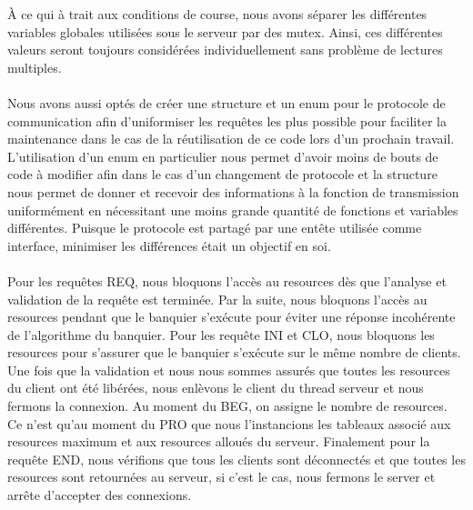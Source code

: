 \documentclass[11pt]{article}
\begin{document}
À ce qui à trait aux conditions de course, nous avons séparer les différentes variables globales utilisées sous le serveur par des mutex. Ainsi, ces différentes valeurs seront toujours considérées individuellement sans problème de lectures multiples. \\\\

Nous avons aussi optés de créer une structure et un enum pour le protocole de communication afin d'uniformiser les requêtes les plus possible pour faciliter la maintenance dans le cas de la réutilisation de ce code lors d'un prochain travail. L'utilisation d'un enum en particulier nous permet d'avoir moins de bouts de code à modifier afin dans le cas d'un changement de protocole et la structure nous permet de donner et recevoir des informations à la fonction de transmission uniformément en nécessitant une moins grande quantité de fonctions et variables différentes. Puisque le protocole est partagé par une entête utilisée comme interface, minimiser les différences était un objectif en soi.\\\\

Pour les requêtes REQ, nous bloquons l'accès au resources dès que l'analyse et validation de la requête est terminée. Par la suite, nous bloquons l'accès au resources pendant que le banquier s'exécute pour éviter une réponse incohérente de l'algorithme du banquier. Pour les requête INI et CLO, nous bloquons les resources pour s'assurer que le banquier s'exécute sur le même nombre de clients. Une fois que la validation et nous nous sommes  assurés que toutes les resources du client ont été libérées, nous enlèvons le client du thread serveur et nous fermons la connexion. Au moment du BEG, on assigne le nombre de resources. Ce n'est qu'au moment du PRO que nous l'instancions les tableaux associé aux resources maximum et aux resources alloués du serveur. Finalement pour la requête END, nous vérifions que tous les clients sont déconnectés et que toutes les resources sont retournées au serveur, si c'est le cas, nous fermons le server et arrête d'accepter des connexions.\\\\
\end{document}
